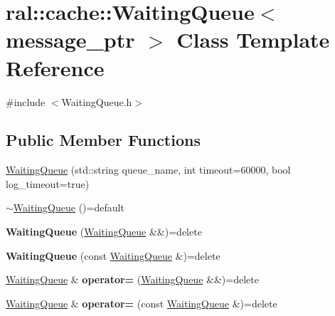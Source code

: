\hypertarget{classral_1_1cache_1_1WaitingQueue}{}\section{ral\+:\+:cache\+:\+:Waiting\+Queue$<$ message\+\_\+ptr $>$ Class Template Reference}
\label{classral_1_1cache_1_1WaitingQueue}


{\ttfamily \#include $<$Waiting\+Queue.\+h$>$}

\subsection*{Public Member Functions}
\begin{DoxyCompactItemize}
\item 
\hyperlink{classral_1_1cache_1_1WaitingQueue_ac69033b0cfeead472b2b0beeed6de93c}{Waiting\+Queue} (std\+::string queue\+\_\+name, int timeout=60000, bool log\+\_\+timeout=true)
\item 
\hyperlink{classral_1_1cache_1_1WaitingQueue_a09240aad671d08e2df7fe90b0a3a268b}{$\sim$\+Waiting\+Queue} ()=default
\item 
\mbox{\label{classral_1_1cache_1_1WaitingQueue_a2c072bc505d3b6e48eef52b3adb98cfd}} 
{\bfseries Waiting\+Queue} (\hyperlink{classral_1_1cache_1_1WaitingQueue}{Waiting\+Queue} \&\&)=delete
\item 
\mbox{\label{classral_1_1cache_1_1WaitingQueue_afc562f0200a6f5e1a9791473ea6398ba}} 
{\bfseries Waiting\+Queue} (const \hyperlink{classral_1_1cache_1_1WaitingQueue}{Waiting\+Queue} \&)=delete
\item 
\mbox{\label{classral_1_1cache_1_1WaitingQueue_a46e9b5f6c88e3ad5a6b54ce2ee7ffbfa}} 
\hyperlink{classral_1_1cache_1_1WaitingQueue}{Waiting\+Queue} \& {\bfseries operator=} (\hyperlink{classral_1_1cache_1_1WaitingQueue}{Waiting\+Queue} \&\&)=delete
\item 
\mbox{\label{classral_1_1cache_1_1WaitingQueue_afd572305420b7188aab015b2949fe082}} 
\hyperlink{classral_1_1cache_1_1WaitingQueue}{Waiting\+Queue} \& {\bfseries operator=} (const \hyperlink{classral_1_1cache_1_1WaitingQueue}{Waiting\+Queue} \&)=delete

\end{DoxyCompactItemize}

